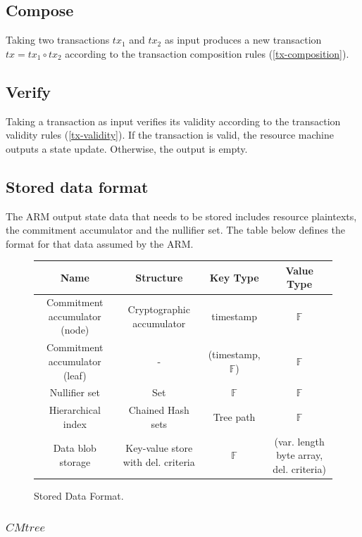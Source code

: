 \subsection{Compose}

Taking two transactions $tx_1$ and $tx_2$ as input produces a new transaction $tx = tx_1 \circ tx_2$ according to the transaction composition rules (\ref{tx-composition}).

\subsection{Verify}

Taking a transaction as input verifies its validity according to the transaction validity rules (\ref{tx-validity}). If the transaction is valid, the resource machine outputs a state update. Otherwise, the output is empty.

\subsection{Stored data format}\label{storage}

The ARM output state data that needs to be stored includes resource plaintexts, the commitment accumulator and the nullifier set. The table below defines the format for that data assumed by the ARM.

\begin{figure}[!h]
\centering
\begin{tabular}{|c|c|c|c|}
\hline
 \textbf{Name} & \textbf{Structure} & \textbf{Key Type} & \textbf{Value Type} \\ \hline
 Commitment accumulator (node) & Cryptographic accumulator & timestamp & $\mathbb{F}$ \\ \hline
  Commitment accumulator (leaf) & - & (timestamp, $\mathbb{F}$) & $\mathbb{F}$ \\ \hline
 Nullifier set & Set & $\mathbb{F}$ & $\mathbb{F}$ \\ \hline
 Hierarchical index & Chained Hash sets & Tree path & $\mathbb{F}$ \\ \hline
 Data blob storage & Key-value store with del. criteria & $\mathbb{F}$ & (var. length byte array, del. criteria) \\ \hline
\end{tabular}
\caption{Stored Data Format.}
\end{figure}

\subsubsection{$CMtree$}

